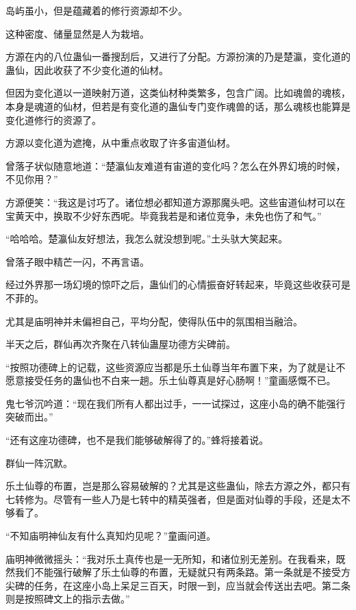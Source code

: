 
\begin{this_body}



岛屿虽小，但是蕴藏着的修行资源却不少。

这种密度、储量显然是人为栽培。

方源在内的八位蛊仙一番搜刮后，又进行了分配。方源扮演的乃是楚瀛，变化道的蛊仙，因此收获了不少变化道的仙材。

但因为变化道以一道映射万道，这类仙材种类繁多，包含广阔。比如魂兽的魂核，本身是魂道的仙材，但若是有变化道的蛊仙专门变作魂兽的话，那么魂核也能算是变化道修行的资源了。

方源以变化道为遮掩，从中重点收取了许多宙道仙材。

曾落子状似随意地道：“楚瀛仙友难道有宙道的变化吗？怎么在外界幻境的时候，不见你用？”

方源便笑：“我这是讨巧了。诸位想必都知道方源那魔头吧。这些宙道仙材可以在宝黄天中，换取不少好东西呢。毕竟我若是和诸位竞争，未免也伤了和气。”

“哈哈哈。楚瀛仙友好想法，我怎么就没想到呢。”土头驮大笑起来。

曾落子眼中精芒一闪，不再言语。

经过外界那一场幻境的惊吓之后，蛊仙们的心情振奋好转起来，毕竟这些收获可是不菲的。

尤其是庙明神并未偏袒自己，平均分配，使得队伍中的氛围相当融洽。

半天之后，群仙再次齐聚在八转仙蛊屋功德方尖碑前。

“按照功德碑上的记载，这些资源应当都是乐土仙尊当年布置下来，为了就是让不愿意接受任务的蛊仙也不白来一趟。乐土仙尊真是好心肠啊！”童画感慨不已。

鬼七爷沉吟道：“现在我们所有人都出过手，一一试探过，这座小岛的确不能强行突破而出。”

“还有这座功德碑，也不是我们能够破解得了的。”蜂将接着说。

群仙一阵沉默。

乐土仙尊的布置，岂是那么容易破解的？尤其是这些蛊仙，除去方源之外，都只有七转修为。尽管有一些人乃是七转中的精英强者，但是面对仙尊的手段，还是太不够看了。

“不知庙明神仙友有什么真知灼见呢？”童画问道。

庙明神微微摇头：“我对乐土真传也是一无所知，和诸位别无差别。在我看来，既然我们不能强行破解了乐土仙尊的布置，无疑就只有两条路。第一条就是不接受方尖碑的任务，在这座小岛上呆足三百天，时限一到，应当就会传送出去吧。第二条则是按照碑文上的指示去做。”


\end{this_body}
